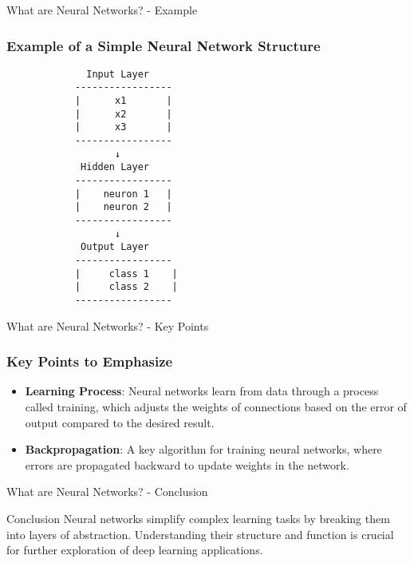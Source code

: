 \documentclass[aspectratio=169]{beamer}
\begin{document}
\begin{frame}[fragile]{What are Neural Networks? - Example}
    \frametitle{Example of a Simple Neural Network Structure}

    \begin{verbatim}
              Input Layer
            -----------------
            |      x1       |
            |      x2       |
            |      x3       |
            -----------------
                   ↓
             Hidden Layer
            -----------------
            |    neuron 1   |
            |    neuron 2   |
            -----------------
                   ↓
             Output Layer
            -----------------
            |     class 1    |
            |     class 2    |
            -----------------
    \end{verbatim}
\end{frame}

\begin{frame}[fragile]{What are Neural Networks? - Key Points}
    \frametitle{Key Points to Emphasize}

    \begin{itemize}
        \item \textbf{Learning Process}: Neural networks learn from data through a process called training, which adjusts the weights of connections based on the error of output compared to the desired result.
        \item \textbf{Backpropagation}: A key algorithm for training neural networks, where errors are propagated backward to update weights in the network.
    \end{itemize}
\end{frame}

\begin{frame}[fragile]{What are Neural Networks? - Conclusion}
    \begin{block}{Conclusion}
        Neural networks simplify complex learning tasks by breaking them into layers of abstraction. Understanding their structure and function is crucial for further exploration of deep learning applications.
    \end{block}
\end{frame}
\end{document}
